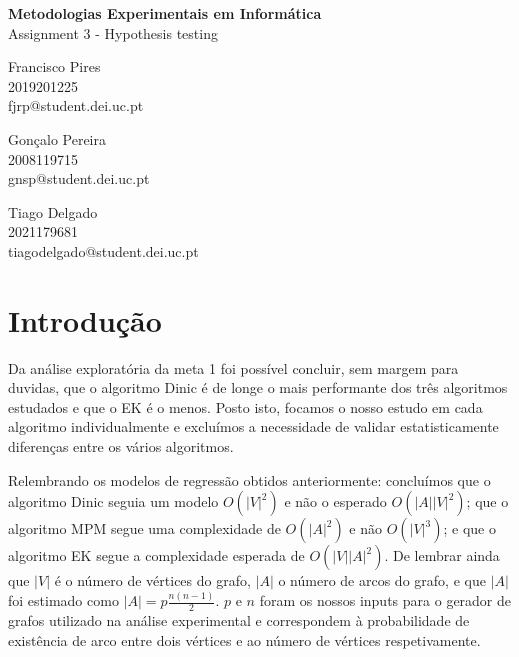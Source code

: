 \documentclass{uofa-eng-assignment}
\newcommand*{\course}{Metodologias Experimentais em Informática}
\newcommand*{\assignment}{Assignment 3 -  Hypothesis testing}
\begin{document}
\begin{center}
    \textbf{\large \course}\\
    \assignment
\end{center}

\begin{center}
\begin{minipage}{0.3\textwidth}
\begin{center}Francisco Pires\\2019201225\\fjrp@student.dei.uc.pt\end{center}
\end{minipage}
\begin{minipage}{0.3\textwidth}
\begin{center}Gonçalo Pereira\\2008119715\\gnsp@student.dei.uc.pt\end{center}
\end{minipage}
\begin{minipage}{0.3\textwidth}
\begin{center}Tiago Delgado\\2021179681\\tiagodelgado@student.dei.uc.pt\end{center}
\end{minipage}
\end{center}

\section{Introdução}

Da análise exploratória da meta 1 foi possível concluir, sem margem para duvidas, que o algoritmo Dinic é de longe o mais performante dos três algoritmos estudados e que o EK é o menos. Posto isto, focamos o nosso estudo em cada algoritmo individualmente e excluímos a necessidade de validar estatisticamente diferenças entre os vários algoritmos.

Relembrando os modelos de regressão obtidos anteriormente: concluímos que o algoritmo Dinic seguia um modelo $O(|V|^2)$ e não o esperado $O(|A||V|^2)$; que o algoritmo MPM segue uma complexidade de $O(|A|^2)$ e não $O(|V|^3)$; e que o algoritmo EK segue a complexidade esperada de $O(|V||A|^2)$. De lembrar ainda que $|V|$ é o número de vértices do grafo, $|A|$ o número de arcos do grafo, e que $|A|$ foi estimado como $|A|=p\frac{n(n-1)}{2}$. $p$ e $n$ foram os nossos inputs para o gerador de grafos utilizado na análise experimental e correspondem à probabilidade de existência de arco entre dois vértices e ao número de vértices respetivamente.
\end{document}
